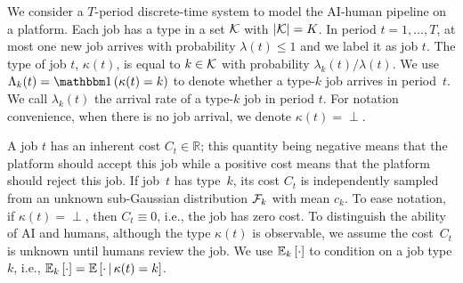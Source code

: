 We consider a $T$-period discrete-time system to model the AI-human pipeline on a platform. Each job has a type in a set $\mathcal{K}$ with $|\mathcal{K}| = K$. In period $t=1,\ldots,T$, at most one new job arrives with probability $\lambda(t) \leq 1$ and we label it as job $t$. The type of job $t$, $\kappa(t)$, is equal to $k \in \mathcal{K}$ with probability $\lambda_k(t) / \lambda(t)$. We use $\Lambda_k(t) = \indic{\kappa(t) = k}$ to denote whether a type-$k$ job arrives in period~$t$. We call $\lambda_k(t)$ the arrival rate of a type-$k$ job in period $t$. For notation convenience, when there is no job arrival, we denote $\kappa(t) = \perp.$

A job $t$ has an inherent cost $C_t \in \mathbb{R}$; 
this quantity being negative means that the platform should accept this job while a positive cost means that the platform should reject this job. If job~$t$ has type~$k$, its cost $C_t$ is independently sampled from an unknown sub-Gaussian distribution $\mathcal{F}_k$ with mean $c_k$. To ease notation, if $\kappa(t) = \perp$, then $C_t \equiv 0$, i.e., the job has zero cost. To distinguish the ability of AI and humans, although the type $\kappa(t)$ is observable, we assume the cost~$C_t$ is
unknown until humans review the job. We use $\mathbb E_{k}\left[\cdot\right]$ to condition on a job type $k$, i.e., $\mathbb E_{k}\left[\cdot\right] = \mathbb E\left[\cdot \,\middle\vert\, \kappa(t) = k\right]$.

